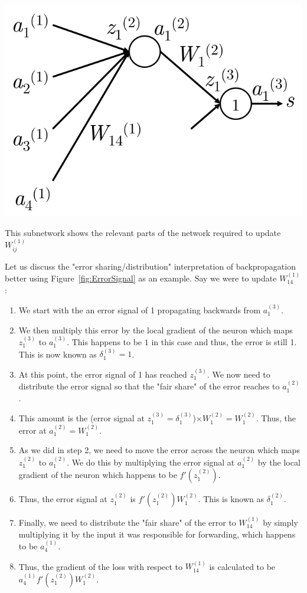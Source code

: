 \documentclass{tufte-handout}
\begin{document}
\begin{marginfigure}%
  \includegraphics[width=\linewidth]{ErrorSignal}
  \caption{This subnetwork shows the relevant parts of the network required to update $W^{(1)}_{ij}$}
  \label{fig:ErrorSignal}
\end{marginfigure}

Let us discuss the "error sharing/distribution" interpretation of  backpropagation better using Figure~\ref{fig:ErrorSignal} as an example. Say we were to update $W^{(1)}_{14}$:
\begin{enumerate}
\item We start with the an error signal of 1 propagating backwards from $a_1^{(3)}$.
\item We then multiply this error by the local gradient of the neuron which maps $z_1^{(3)}$ to $a_1^{(3)}$. This happens to be $1$ in this case and thus, the error is still 1. This is now known as $\delta_1^{(3)} = 1$.
\item At this point, the error signal of 1 has reached $z_1^{(3)}$. We now need to distribute the error signal so that the "fair share" of the error reaches to $a_1^{(2)}$.
\item This amount is the (error signal at $z_1^{(3)} = \delta_1^{(3)}$)$ \times W_{1}^{(2)} = W_{1}^{(2)}$. Thus, the error at $a_1^{(2)} = W_{1}^{(2)}$.
\item As we did in step 2, we need to move the error across the neuron which maps $z_1^{(2)}$ to $a_1^{(2)}$. We do this by multiplying the error signal at $a_1^{(2)}$ by the local gradient of the neuron which happens to be $f'(z_1^{(2)})$.
\item Thus, the error signal at $z_1^{(2)}$ is $f'(z_1^{(2)})  W_{1}^{(2)}$. This is known as $\delta_1^{(2)}$.
\item Finally, we need to distribute the "fair share" of the error to $W^{(1)}_{14}$ by simply multiplying it by the input it was responsible for forwarding, which happens to be $a_4^{(1)}$.
\item Thus, the gradient of the loss with respect to $W^{(1)}_{14}$ is calculated to be $a_4^{(1)} f'(z_1^{(2)})  W_{1}^{(2)}$.
\end{enumerate}
\end{document}
